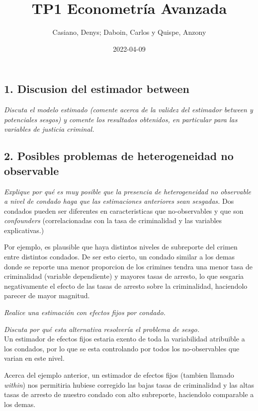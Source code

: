 \documentclass[
]{article}
\title{TP1 Econometría Avanzada}
\author{Casiano, Denys; Daboin, Carlos y Quispe, Anzony}
\date{2022-04-09}
\begin{document}
\maketitle

\hypertarget{discusion-del-estimador-between}{%
\subsection{1. Discusion del estimador
between}\label{discusion-del-estimador-between}}

\emph{Discuta el modelo estimado (comente acerca de la validez del
estimador between y potenciales sesgos) y comente los resultados
obtenidos, en particular para las variables de justicia criminal.}

\hypertarget{posibles-problemas-de-heterogeneidad-no-observable}{%
\subsection{2. Posibles problemas de heterogeneidad no
observable}\label{posibles-problemas-de-heterogeneidad-no-observable}}

\emph{Explique por qué es muy posible que la presencia de heterogeneidad
no observable a nivel de condado haga que las estimaciones anteriores
sean sesgadas. } Dos condados pueden ser diferentes en caracteristicas
que no-observables y que son \emph{confounders} (correlacionadas con la
tasa de criminalidad y las variables explicativas.)

Por ejemplo, es plausible que haya distintos niveles de subreporte del
crimen entre distintos condados. De ser esto cierto, un condado similar
a los demas donde se reporte una menor proporcion de los crimines tendra
una menor tasa de criminalidad (variable dependiente) y mayores tasas de
arresto, lo que sesgaria negativamente el efecto de las tasas de arresto
sobre la criminalidad, haciendolo parecer de mayor magnitud.

\emph{Realice una estimación con efectos fijos por condado.}

\emph{Discuta por qué esta alternativa resolvería el problema de sesgo.
}\\
Un estimador de efectos fijos estaria exento de toda la variabilidad
atribuible a los condados, por lo que se esta controlando por todos los
no-observables que varian en este nivel.

Acerca del ejemplo anterior, un estimador de efectos fijos (tambien
llamado \emph{within}) nos permitiria hubiese corregido las bajas tasas
de criminalidad y las altas tasas de arresto de nuestro condado con alto
subreporte, haciendolo comparable a los demas.
\end{document}
